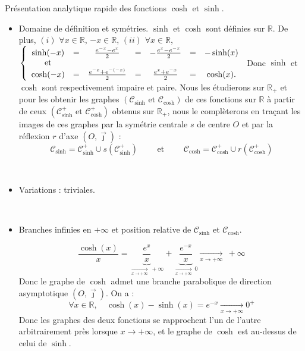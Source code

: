 \documentclass{article}
\renewenvironment{question_kholle}[2][ ]
{
	\subsection{\texorpdfstring{#2}{}}
	\notblank{#1}
	{
		\noindent #1
		\bigbreak
	}
	{}
	\begin{proof}
}
{
	\end{proof}
}
\begin{document}
\begin{question_kholle}{Présentation analytique rapide des fonctions \(\cosh\) et \(\sinh \).}
	~\smallbreak
	
	\begin{itemize}[label=$\bullet$]
		\item Domaine de définition et symétries.
		\newline
		$\sinh$ et $\cosh$ sont définies sur $\mathbb{R}$. 
		\newline
		De plus, 
		\newline
		$(i)$ $\forall x \in \mathbb{R}$, $-x\in \mathbb{R}$, 
		\newline
		$(ii)$ $\forall x \in \mathbb{R}$, 
		$
			\left\{ \begin{array}{c c c c c c c}
			\sinh (-x) & = & \frac{e^{-x} - e^{x}}{2} & = & - \frac{e^x - e^{-x}}{2} & = & -\sinh(x) \\
			\text{et} & & & & & & \\ 
			\cosh (-x) & = & \frac{e^{-x} + e^{-(-x)}}{2} & = &  \frac{e^x + e^{-x}}{2} & = & \cosh(x).
			\end{array} 
			\right.
		$
		\newline
		Donc $\sinh$ et $\cosh$ sont respectivement impaire et paire.
		\newline
		Nous les étudierons sur $\mathbb{R}_+$ et pour les obtenir les graphes $(\mathcal{C}_{\sinh} \text{ et } \mathcal{C}_{\cosh})$ de ces fonctions sur $\mathbb{R}$ à partir de ceux $(\mathcal{C}_{\sinh}^+ \text{ et } \mathcal{C}_{\cosh}^+)$ obtenus sur $\mathbb{R}_+$, nous le complèterons en traçant les images de ces graphes par la symétrie centrale $s$ de centre $O$ et par la réflexion $r$ d'axe $\left( O, \overrightarrow{\jmath} \right)$ : 
		\[
			\mathcal{C}_{\sinh} = \mathcal{C}_{\sinh}^+ \cup s \left( \mathcal{C}_{\sinh}^+ \right) \qquad \text{ et } \qquad \mathcal{C}_{\cosh} = \mathcal{C}_{\cosh}^+ \cup r \left( \mathcal{C}_{\cosh}^+ \right)
		\]
		
		\
		
		\item Variations : triviales.
		
		\
		
		\item Branches infinies en $+\infty$ et position relative de $\mathcal{C}_{\sinh}$ et $\mathcal{C}_{\cosh}$.
		
		\[
			\frac{\cosh(x)}{x} = \underset{\xrightarrow[x\to +\infty]{} \ +\infty}{\underbrace{\frac{e^{x}}{x}}} + \underset{\xrightarrow[x\to +\infty]{} \ 0}{\underbrace{\frac{e^{-x}}{x}}} \xrightarrow[x\to +\infty]{} \ +\infty
		\]
		Donc le graphe de $\cosh$ admet une branche parabolique de direction asymptotique $\left( O, \overrightarrow{\jmath}\right)$.
		\newline
		On a : 
		\[
			\forall x \in \mathbb{R}, \quad \cosh(x) - \sinh(x) = e^{-x} \xrightarrow[x\to +\infty]{} 0^+
		\]
		Donc les graphes des deux fonctions se rapprochent l'un de l'autre arbitrairement près lorsque $x \to +\infty$, et le graphe de $\cosh$ est au-dessus de celui de $\sinh$.
		

\end{itemize}
\end{question_kholle}
\end{document}
